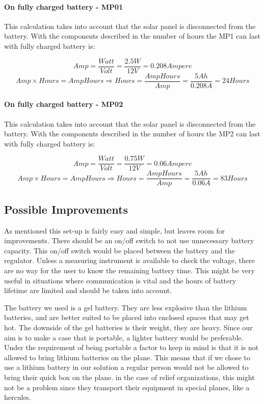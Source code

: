 \paragraph{On fully charged battery - MP01}
This calculation takes into account that the solar panel is disconnected from the battery. With the components described in  the number of hours the MP1 can last with fully charged battery is: 

$$Amp = \frac{Watt}{Volt} = \frac{2.5 W}{12 V} = 0.208 Ampere$$
$$Amp\times Hours = AmpHours \Rightarrow Hours = \frac{AmpHours}{Amp} = \frac{5 Ah}{0.208 A} = 24 Hours$$

\paragraph{On fully charged battery - MP02}
This calculation takes into account that the solar panel is disconnected from the battery. With the components described in  the number of hours the MP2 can last with fully charged battery is: 

$$Amp = \frac{Watt}{Volt} = \frac{0.75 W}{12 V} = 0.06 Ampere$$
$$Amp\times Hours = AmpHours \Rightarrow Hours = \frac{AmpHours}{Amp} = \frac{5 Ah}{0.06 A} = 83 Hours$$


\subsection{Possible Improvements}
As mentioned this set-up is fairly easy and simple, but leaves room for improvements. There should be an on/off switch to not use unnecessary battery capacity. This on/off switch would be placed between the battery and the regulator. Unless a measuring instrument is available to check the voltage, there are no way for the user to know the remaining battery time. This might be very useful in situations where communication is vital and the hours of battery lifetime are limited and should be taken into account. 

The battery we used is a gel battery. They are less explosive than the lithium batteries, and are better suited to be placed into enclosed spaces that may get hot. The downside of the gel batteries is their weight, they are heavy. Since our aim is to make a case that is portable, a lighter battery would be preferable. Under the requirement of being portable a factor to keep in mind is that it is not allowed to bring lithium batteries on the plane. This means that if we chose to use a lithium battery in our solution a regular person would not be allowed to bring their \gls{quick} box on the plane. in the case of relief organizations, this might not be a problem since they transport their equipment in special planes, like a hercules. 

